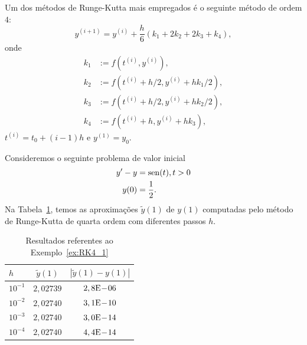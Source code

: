 Um dos métodos de Runge-Kutta mais empregados é o seguinte método de ordem $4$:
\begin{equation}
  y^{(i+1)} = y^{(i)} + \frac{h}{6}(k_1 + 2k_2 + 2k_3 + k_4),
\end{equation}
onde
\begin{align}
  k_1 &:= f(t^{(i)},y^{(i)}),\\
  k_2 &:= f(t^{(i)}+h/2,y^{(i)}+hk_1/2),\\
  k_3 &:= f(t^{(i)}+h/2,y^{(i)}+hk_2/2),\\
  k_4 &:= f(t^{(i)}+h,y^{(i)}+hk_3),
\end{align}
$t^{(i)}=t_0+(i-1)h$ e $y^{(1)}=y_0$.

\begin{ex}\label{ex:RK4_1}
  Consideremos o seguinte problema de valor inicial
  \begin{align}
    y' - y &= \operatorname{sen}(t), t>0\\
    y(0) &= \frac{1}{2}.
  \end{align}
  Na Tabela~\ref{tab:ex_RK4_1}, temos as aproximações $\tilde{y}(1)$ de $y(1)$ computadas pelo método de Runge-Kutta de quarta ordem com diferentes passos $h$.
 
  \begin{table}[h!]
    \centering
    \begin{tabular}{l|cc}
      $h$ & $\tilde{y}(1)$ & $|\tilde{y}(1)-y(1)|$\\\hline
      $10^{-1}$ & $2,02739$ & $2,8\mathrm{E}\!-\!06$ \\
      $10^{-2}$ & $2,02740$ & $3,1\mathrm{E}\!-\!10$ \\
      $10^{-3}$ & $2,02740$ & $3,0\mathrm{E}\!-\!14$ \\
      $10^{-4}$ & $2,02740$ & $4,4\mathrm{E}\!-\!14$ \\\hline
    \end{tabular}
    \caption{Resultados referentes ao Exemplo~\ref{ex:RK4_1}}
    \label{tab:ex_RK4_1}
  \end{table}





\end{ex}

